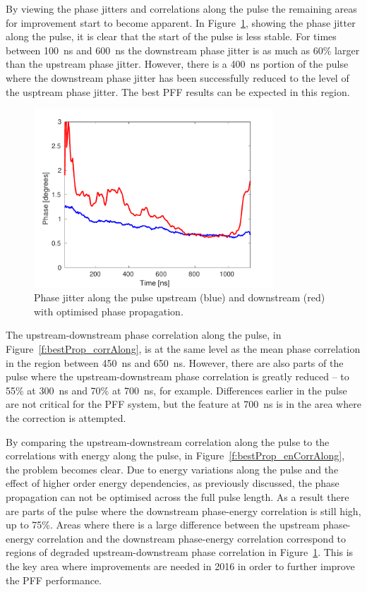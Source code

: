 By viewing the phase jitters and correlations along the pulse the remaining areas for improvement start to become apparent. In Figure~\ref{f:bestProp_jitAlong}, showing the phase jitter along the pulse, it is clear that the start of the pulse is less stable. For times between 100~ns and 600~ns the downstream phase jitter is as much as 60\% larger than the upstream phase jitter.  However, there is a 400~ns portion of the pulse where the downstream phase jitter has been successfully reduced to the level of the usptream phase jitter. The best PFF results can be expected in this region.

\begin{figure}
  \centering
  \includegraphics[width=0.8\textwidth]{Figures/propagation/bestProp_jitAlong}
  \caption{Phase jitter along the pulse upstream (blue) and downstream (red) with optimised phase propagation.}
  \label{f:bestProp_jitAlong}
\end{figure}

The upstream-downstream phase correlation along the pulse, in Figure~\ref{f:bestProp_corrAlong}, is at the same level as the mean phase correlation in the region between 450~ns and 650~ns. However, there are also parts of the pulse where the upstream-downstream phase correlation is greatly reduced -- to 55\% at 300~ns and 70\% at 700~ns, for example. Differences earlier in the pulse are not critical for the PFF system, but the feature at 700~ns is in the area where the correction is attempted.

By comparing the upstream-downstream correlation along the pulse to the correlations with energy along the pulse, in Figure~\ref{f:bestProp_enCorrAlong}, the problem becomes clear. Due to energy variations along the pulse and the effect of higher order energy dependencies, as previously discussed, the phase propagation can not be optimised across the full pulse length. As a result there are parts of the pulse where the downstream phase-energy correlation is still high, up to 75\%. Areas where there is a large difference between the upstream phase-energy correlation and the downstream phase-energy correlation correspond to regions of degraded upstream-downstream phase correlation in Figure~\ref{f:bestProp_jitAlong}. This is the key area where improvements are needed in 2016 in order to further improve the PFF performance.

